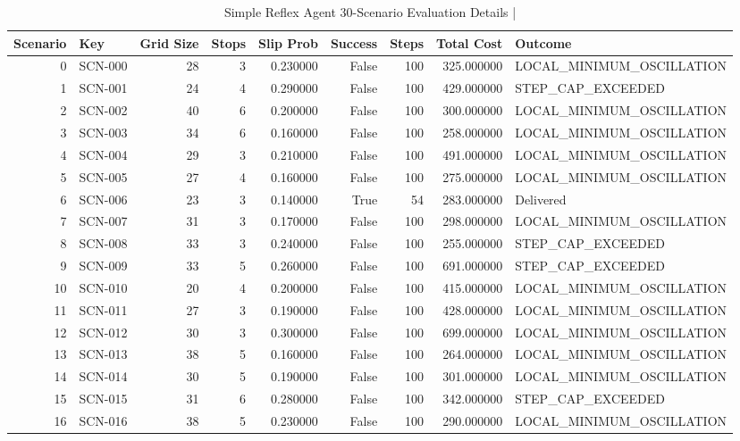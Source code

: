 \begin{table}[htbp]
\centering
\caption{Simple Reflex Agent 30-Scenario Evaluation Details | \stampline}
\label{tab:partA_reflex_scenarios}
\begin{tabular}{rlrrrrrrl}
\toprule
Scenario & Key & Grid Size & Stops & Slip Prob & Success & Steps & Total Cost & Outcome \\
\midrule
0 & SCN-000 & 28 & 3 & 0.230000 & False & 100 & 325.000000 & LOCAL\_MINIMUM\_OSCILLATION \\
1 & SCN-001 & 24 & 4 & 0.290000 & False & 100 & 429.000000 & STEP\_CAP\_EXCEEDED \\
2 & SCN-002 & 40 & 6 & 0.200000 & False & 100 & 300.000000 & LOCAL\_MINIMUM\_OSCILLATION \\
3 & SCN-003 & 34 & 6 & 0.160000 & False & 100 & 258.000000 & LOCAL\_MINIMUM\_OSCILLATION \\
4 & SCN-004 & 29 & 3 & 0.210000 & False & 100 & 491.000000 & LOCAL\_MINIMUM\_OSCILLATION \\
5 & SCN-005 & 27 & 4 & 0.160000 & False & 100 & 275.000000 & LOCAL\_MINIMUM\_OSCILLATION \\
6 & SCN-006 & 23 & 3 & 0.140000 & True & 54 & 283.000000 & Delivered \\
7 & SCN-007 & 31 & 3 & 0.170000 & False & 100 & 298.000000 & LOCAL\_MINIMUM\_OSCILLATION \\
8 & SCN-008 & 33 & 3 & 0.240000 & False & 100 & 255.000000 & STEP\_CAP\_EXCEEDED \\
9 & SCN-009 & 33 & 5 & 0.260000 & False & 100 & 691.000000 & STEP\_CAP\_EXCEEDED \\
10 & SCN-010 & 20 & 4 & 0.200000 & False & 100 & 415.000000 & LOCAL\_MINIMUM\_OSCILLATION \\
11 & SCN-011 & 27 & 3 & 0.190000 & False & 100 & 428.000000 & LOCAL\_MINIMUM\_OSCILLATION \\
12 & SCN-012 & 30 & 3 & 0.300000 & False & 100 & 699.000000 & LOCAL\_MINIMUM\_OSCILLATION \\
13 & SCN-013 & 38 & 5 & 0.160000 & False & 100 & 264.000000 & LOCAL\_MINIMUM\_OSCILLATION \\
14 & SCN-014 & 30 & 5 & 0.190000 & False & 100 & 301.000000 & LOCAL\_MINIMUM\_OSCILLATION \\
15 & SCN-015 & 31 & 6 & 0.280000 & False & 100 & 342.000000 & STEP\_CAP\_EXCEEDED \\
16 & SCN-016 & 38 & 5 & 0.230000 & False & 100 & 290.000000 & LOCAL\_MINIMUM\_OSCILLATION \\

\end{tabular}
\end{table}
